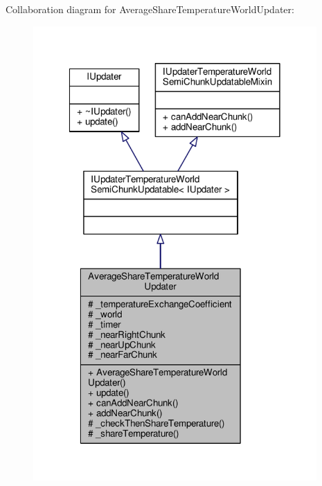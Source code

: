 Collaboration diagram for Average\-Share\-Temperature\-World\-Updater\-:
\nopagebreak
\begin{figure}[H]
\begin{center}
\leavevmode
\includegraphics[width=307pt]{class_average_share_temperature_world_updater__coll__graph}
\end{center}
\end{figure}
